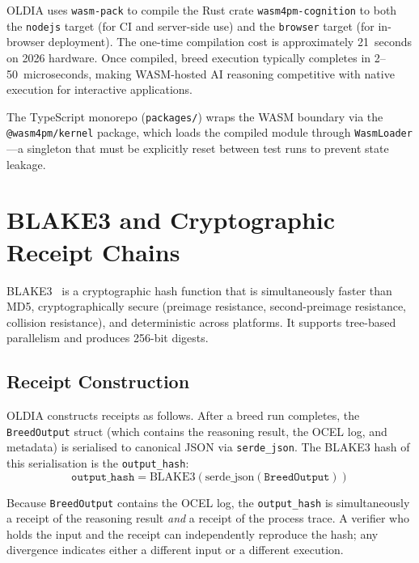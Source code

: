 OLDIA uses \texttt{wasm-pack} to compile the Rust crate
\texttt{wasm4pm-cognition} to both the \texttt{nodejs} target (for CI and
server-side use) and the \texttt{browser} target (for in-browser deployment).
The one-time compilation cost is approximately 21~seconds on 2026 hardware.
Once compiled, breed execution typically completes in 2--50~microseconds,
making WASM-hosted AI reasoning competitive with native execution for
interactive applications.

The TypeScript monorepo (\texttt{packages/}) wraps the WASM boundary via
the \texttt{@wasm4pm/kernel} package, which loads the compiled module through
\texttt{WasmLoader}---a singleton that must be explicitly reset between test
runs to prevent state leakage.

\section{BLAKE3 and Cryptographic Receipt Chains}
\label{sec:blake3}

BLAKE3~\cite{oconnor2021} is a cryptographic hash function that is
simultaneously faster than MD5, cryptographically secure (preimage resistance,
second-preimage resistance, collision resistance), and deterministic across
platforms.  It supports tree-based parallelism and produces 256-bit digests.

\subsection{Receipt Construction}
\label{subsec:receipt}

OLDIA constructs receipts as follows.  After a breed run completes, the
\texttt{BreedOutput} struct (which contains the reasoning result, the OCEL log,
and metadata) is serialised to canonical JSON via \texttt{serde\_json}.  The
BLAKE3 hash of this serialisation is the \texttt{output\_hash}:
\begin{equation}
  \texttt{output\_hash} = \mathrm{BLAKE3}(\mathrm{serde\_json}(\texttt{BreedOutput}))
  \label{eq:output-hash}
\end{equation}

Because \texttt{BreedOutput} contains the OCEL log, the \texttt{output\_hash}
is simultaneously a receipt of the reasoning result \emph{and} a receipt of
the process trace.  A verifier who holds the input and the receipt can
independently reproduce the hash; any divergence indicates either a different
input or a different execution.

